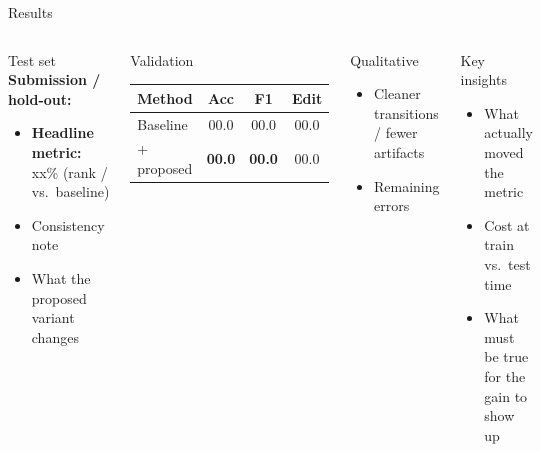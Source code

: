 \documentclass[9pt,aspectratio=169]{beamer}
\begin{document}
\begin{frame}{Results}
  \begin{columns}[T,onlytextwidth]
      \begin{block}{Test set}
        \textbf{Submission / hold-out:}
        \begin{itemize}
          \item \textbf{Headline metric:} xx\% (rank / vs.\ baseline)
          \item Consistency note
          \item What the proposed variant changes
        \end{itemize}
      \end{block}

      \begin{block}{Validation}
        \vspace{0.5em}
        \centering
        \renewcommand{\arraystretch}{1.15}
        \begin{tabular}{lccc}
          \toprule
          \textbf{Method} & \textbf{Acc} & \textbf{F1} & \textbf{Edit} \\
          \midrule
          Baseline & 00.0 & 00.0 & 00.0 \\
          + proposed & \textbf{00.0} & \textbf{00.0} & 00.0 \\
          \bottomrule
        \end{tabular}
        \vspace{0.5em}
      \end{block}

      \begin{block}{Qualitative}
        \begin{itemize}
          \item Cleaner transitions / fewer artifacts
          \item Remaining errors
        \end{itemize}
      \end{block}

      \begin{block}{Key insights}
        \begin{itemize}
          \item What actually moved the metric
          \item Cost at train vs.\ test time
          \item What must be true for the gain to show up
        \end{itemize}
      \end{block}
  \end{columns}
\end{frame}
\end{document}
